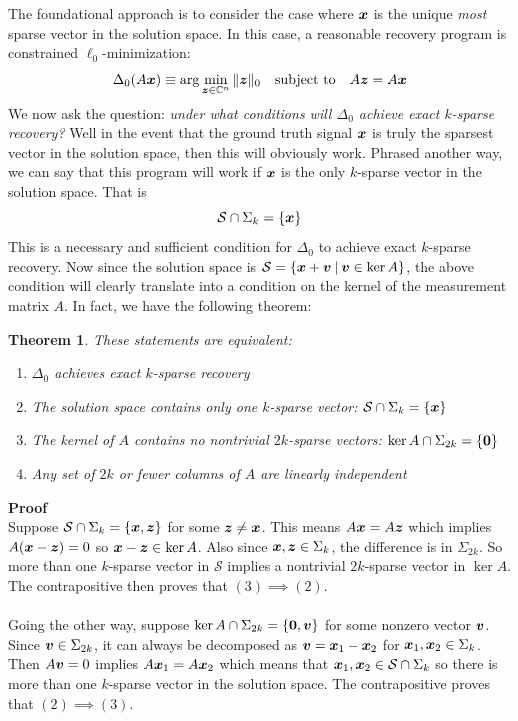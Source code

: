 \documentclass[twocolumn]{gwclass}
\newtheorem{theorem}{Theorem}[section]
\newcommand{\C}{\mathbb{C}}
\begin{document}
	The foundational approach is to consider the case where $\boldsymbol{x}$ is the unique \emph{most} sparse vector in the solution space. In this case, a reasonable recovery program is constrained $\ell_0$-minimization:
	$$ \Delta_0(A\*x)\equiv \arg\min_{\*z\in\C^n} \|\*z\|_0\quad\t{subject to}\quad A\*z=A\*x $$
	We now ask the question: \emph{under what conditions will $\Delta_0$ achieve exact $k$-sparse recovery?} Well in the event that the ground truth signal $\boldsymbol{x}$ is truly the sparsest vector in the solution space, then this will obviously work. Phrased another way, we can say that this program will work if $\boldsymbol{x}$ is the only $k$-sparse vector in the solution space. That is
	$$ \mathcal{S}\cap \Sigma_k = \{\boldsymbol{x}\} $$
	This is a necessary and sufficient condition for $\Delta_0$ to achieve exact $k$-sparse recovery. Now since the solution space is $\mathcal{S}=\{\boldsymbol{x}+\boldsymbol{v}\:|\:\boldsymbol{v}\in\ker A\}$, the above condition will clearly translate into a condition on the kernel of the measurement matrix $A$. In fact, we have the following theorem:
	\begin{theorem}
		These statements are equivalent:
	\begin{enumerate}
		\setlength\itemsep{0.01em}
		\item $\Delta_0$ achieves exact $k$-sparse recovery
		\item The solution space contains only one $k$-sparse vector: $\mathcal{S}\cap \Sigma_k = \{\boldsymbol{x}\}$
		\item The kernel of $A$ contains no nontrivial $2k$-sparse vectors: $\ker A \cap \Sigma_{2k}=\{\boldsymbol{0}\}$
		\item Any set of $2k$ or fewer columns of $A$ are linearly independent
	\end{enumerate}
	\end{theorem}
	\noindent\textbf{Proof}\\
	Suppose $\mathcal{S}\cap\Sigma_k=\{\boldsymbol{x},\boldsymbol{z}\}$ for some $\boldsymbol{z}\neq \boldsymbol{x}$. This means $A\boldsymbol{x}=A\boldsymbol{z}$ which implies $A(\boldsymbol{x}-\boldsymbol{z})=0$ so $\boldsymbol{x}-\boldsymbol{z}\in\ker A$. Also since $\boldsymbol{x},\boldsymbol{z}\in\Sigma_k$, the difference is in $\Sigma_{2k}$. So more than one $k$-sparse vector in $\mathcal{S}$ implies a nontrivial $2k$-sparse vector in $\ker A$. The contrapositive then proves that $(3)\implies (2)$.
	\\
	\\
	Going the other way, suppose $\ker A\cap\Sigma_{2k}=\{\boldsymbol{0},\boldsymbol{v}\}$ for some nonzero vector $\boldsymbol{v}$. Since $\boldsymbol{v}\in\Sigma_{2k}$, it can always be decomposed as $\boldsymbol{v}=\boldsymbol{x}_1-\boldsymbol{x}_2$ for $\boldsymbol{x}_1,\boldsymbol{x}_2\in\Sigma_k$. Then $A\boldsymbol{v}=0$ implies $A\boldsymbol{x}_1=A\boldsymbol{x}_2$ which means that $\boldsymbol{x}_1,\boldsymbol{x}_2\in\mathcal{S}\cap\Sigma_k$ so there is more than one $k$-sparse vector in the solution space. The contrapositive proves that $(2)\implies (3)$.
\end{document}
